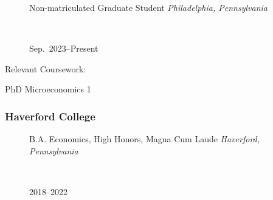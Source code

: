 \documentclass[
  letterpaper,
  DIV=11,
  numbers=noendperiod]{scrartcl}
\begin{document}
\begin{figure}

\begin{minipage}[t]{0.49\linewidth}

{\centering 

\RaggedRight Non-matriculated Graduate Student \newline 
\emph{Philadelphia, Pennsylvania}

}

\end{minipage}%
%
\begin{minipage}[t]{0.02\linewidth}

{\centering 

~

}

\end{minipage}%
%
\begin{minipage}[t]{0.49\linewidth}

{\centering 

\RaggedLeft Sep.~2023--Present

}

\end{minipage}%

\end{figure}

Relevant Coursework:

PhD Microeconomics 1

\hypertarget{haverford-college}{%
\subsubsection{Haverford College}\label{haverford-college}}

\begin{figure}

\begin{minipage}[t]{0.49\linewidth}

{\centering 

\RaggedRight B.A. Economics, High Honors, Magna Cum Laude \newline
\emph{Haverford, Pennsylvania}

}

\end{minipage}%
%
\begin{minipage}[t]{0.02\linewidth}

{\centering 

~

}

\end{minipage}%
%
\begin{minipage}[t]{0.49\linewidth}

{\centering 

\RaggedLeft

2018--2022

}

\end{minipage}%

\end{figure}
\end{document}

